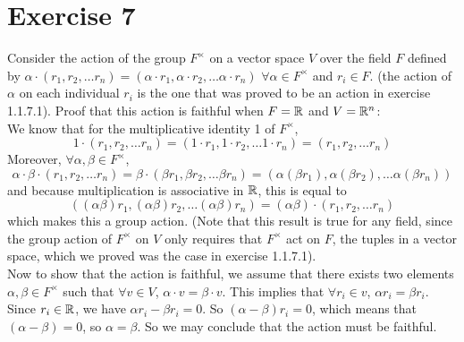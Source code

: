 \documentclass{article}
\begin{document}
    \section*{Exercise 7}
    Consider the action of the group $F^\times$ on a vector space $V$
    over the field $F$ defined by $\alpha \cdot (r_1, r_2, \dots r_n)
    = (\alpha \cdot r_1, \alpha \cdot r_2, \dots \alpha \cdot r_n)$
    $\forall \alpha \in F^\times$ and $r_i \in F$.
    (the action of $\alpha$ on each individual $r_i$ is the one that
    was proved to be an action in exercise 1.1.7.1).
    Proof that this action is faithful when $F = \mathbb{R}$ and $V = \mathbb{R}^n$: \\
    We know that for the multiplicative identity 1 of $F^\times$,
    \[ 1 \cdot (r_1, r_2, \dots r_n) =
    (1 \cdot r_1, 1 \cdot r_2, \dots 1 \cdot r_n)
    = (r_1, r_2, \dots r_n) \]
    Moreover, $\forall \alpha, \beta \in F^\times$,
    \[ \alpha \cdot \beta \cdot (r_1, r_2, \dots r_n)
    = \beta \cdot (\beta r_1, \beta r_2, \dots \beta r_n)
    = (\alpha (\beta r_1), \alpha (\beta r_2),
    \dots \alpha (\beta r_n)) \]
    and because multiplication is associative in $\mathbb{R}$, this is equal to
    \[((\alpha \beta) r_1, (\alpha \beta) r_2,
    \dots (\alpha \beta) r_n)
     = (\alpha \beta) \cdot (r_1, r_2, \dots r_n) \]
    which makes this a group action.
    (Note that this result is true for any field,
    since the group action of $F^\times$ on $V$ only requires that
    $F^\times$ act on $F$, the tuples in a vector space,
    which we proved was the case in exercise 1.1.7.1). \\
    Now to show that the action is faithful,
    we assume that there exists two elements $\alpha, \beta \in F^\times$
    such that $\forall v \in V$, $\alpha \cdot v = \beta \cdot v$.
    This implies that $\forall r_i \in v$,
    $\alpha r_i = \beta r_i$.
    Since $r_i \in \mathbb{R}$,
    we have $\alpha r_i - \beta r_i = 0$.
    So $(\alpha - \beta) r_i = 0$,
    which means that $(\alpha - \beta) = 0$,
    so $\alpha = \beta$.
    So we may conclude that the action must be faithful.
\end{document}

